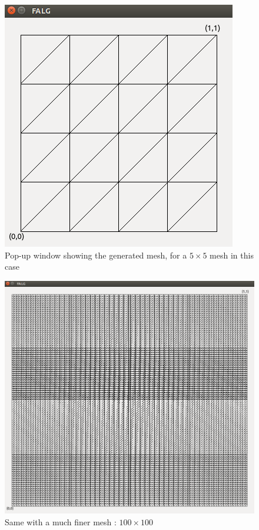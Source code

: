 \documentclass[a4paper]{report}
\begin{document}
\begin{figure}[H]
\begin{center}
\includegraphics[scale=0.50]{mesh_5.png}\caption{Pop-up window showing the generated mesh, for a $5 
\times 5$ mesh in this case}
\end{center}
\end{figure}

\begin{figure}[H]
\begin{center}
\includegraphics[scale=0.30]{mesh_100.png}\caption{Same with a much finer mesh : $100 \times 100$}
\end{center}
\end{figure}
\end{document}
